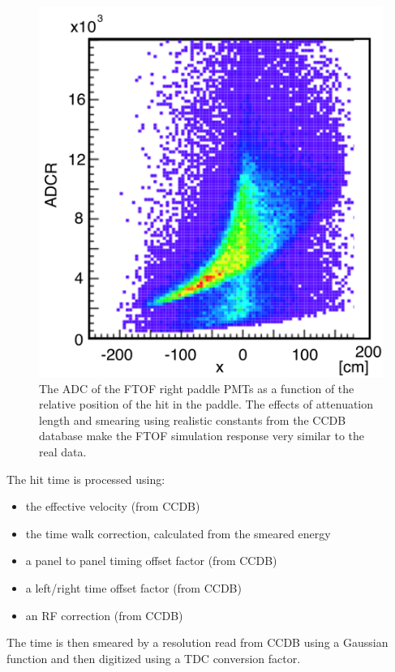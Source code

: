 \begin{figure}
	\centering
	\includegraphics[width=0.99\columnwidth,keepaspectratio]{img/ftofAtten.png}
	\caption{The ADC of the FTOF right paddle PMTs as a function of the relative position of the hit in the paddle. The effects of attenuation
				length and smearing using realistic constants from the CCDB database make the FTOF simulation response very similar to the real data.}
	\label{fig:ftofAtten}
\end{figure}

The hit time is processed using:

\begin{itemize}
	\item the effective velocity (from CCDB)
	\item the time walk correction, calculated from the smeared energy
	\item a panel to panel timing offset factor (from CCDB)
	\item a left/right time offset factor (from CCDB)
	\item an RF correction (from CCDB)
\end{itemize}

The time is then smeared by a resolution read from CCDB using a Gaussian function and then digitized using a TDC conversion factor.

